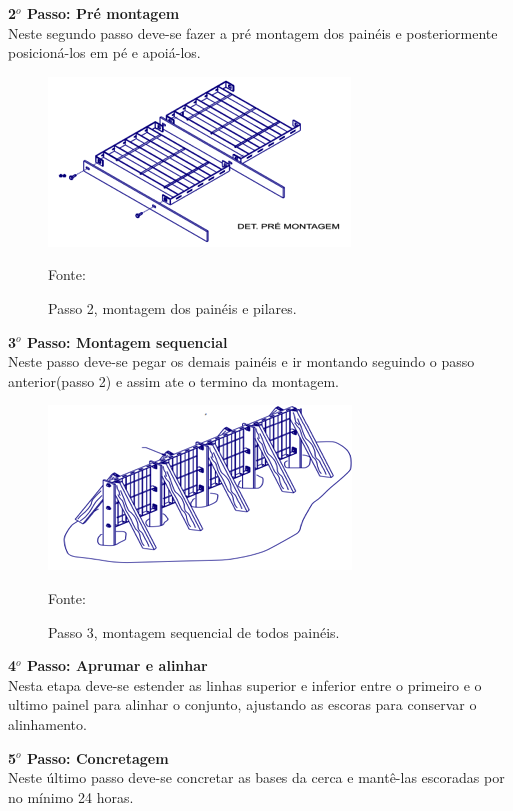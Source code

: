 \textbf{2$^{o}$ Passo: Pr\'e montagem} \\ Neste segundo passo deve-se fazer a  pr\'e montagem dos pain\'eis e posteriormente posicion\'a-los em p\'e e apoi\'a-los.

\begin{figure}[H]
	\centering
	\label{MontagemPaineisPilares}
		\includegraphics[keepaspectratio=true,scale=0.8]{figuras/MontagemPaineisPilares.png}
	\caption{Passo 2, montagem dos pain\'eis e pilares.}
	\small{Fonte: \cite{CatalogoCercamento}}
\end{figure}

\textbf{3$^{o}$ Passo: Montagem sequencial} \\ Neste passo deve-se pegar os demais pain\'eis e ir montando seguindo o passo anterior(passo 2) e assim ate o termino da montagem.

\begin{figure}[H]
	\centering
	\label{MontagemSequencialPaineis}
		\includegraphics[keepaspectratio=true,scale=0.8]{figuras/MontagemSequencialPaineis.png}
	\caption{Passo 3, montagem sequencial de todos pain\'eis.}
	\small{Fonte:  \cite{CatalogoCercamento}}
\end{figure}

\textbf{4$^{o}$ Passo: Aprumar e alinhar} \\ Nesta etapa deve-se estender as linhas superior e inferior entre o primeiro e o ultimo painel para alinhar o conjunto, ajustando as escoras para conservar o alinhamento.

\textbf{5$^{o}$ Passo: Concretagem} \\ Neste \'ultimo passo deve-se concretar as bases da cerca e mant\^e-las escoradas por no m\'inimo 24 horas.


